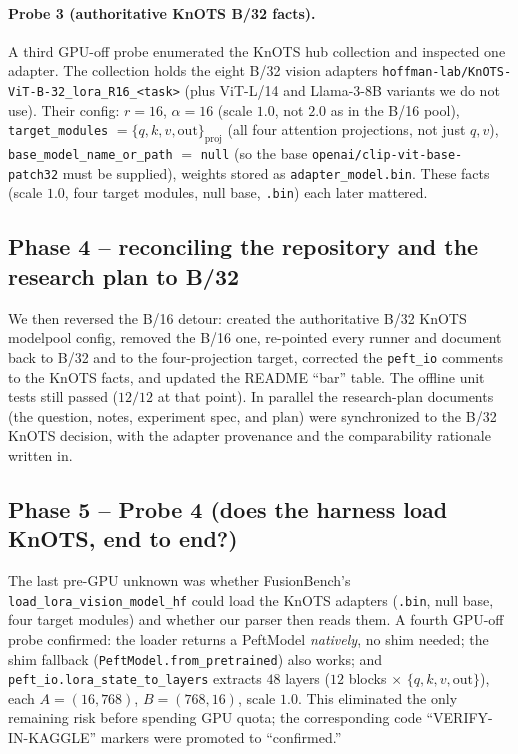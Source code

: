\paragraph{Probe 3 (authoritative KnOTS B/32 facts).}
A third GPU-off probe enumerated the KnOTS hub collection and inspected one adapter. The collection holds
the eight B/32 vision adapters \texttt{hoffman-lab/KnOTS-ViT-B-32\_lora\_R16\_<task>} (plus ViT-L/14 and
Llama-3-8B variants we do not use). Their config: $r=16$, $\alpha=16$ (scale $\mathbf{1.0}$, not $2.0$ as
in the B/16 pool), \texttt{target\_modules} $=\{q,k,v,\text{out}\}_{\text{proj}}$ (all four attention
projections, not just $q,v$), \texttt{base\_model\_name\_or\_path} $=$ \texttt{null} (so the base
\texttt{openai/clip-vit-base-patch32} must be supplied), weights stored as \texttt{adapter\_model.bin}.
These facts (scale $1.0$, four target modules, null base, \texttt{.bin}) each later mattered.

\subsection{Phase 4 -- reconciling the repository and the research plan to B/32}
\label{app:phase-reconcile}
We then reversed the B/16 detour: created the authoritative B/32 KnOTS modelpool config, removed the
B/16 one, re-pointed every runner and document back to B/32 and to the four-projection target, corrected
the \texttt{peft\_io} comments to the KnOTS facts, and updated the README ``bar'' table. The offline unit
tests still passed ($12/12$ at that point). In parallel the research-plan documents (the question,
notes, experiment spec, and plan) were synchronized to the B/32 KnOTS decision, with the adapter
provenance and the comparability rationale written in.

\subsection{Phase 5 -- Probe 4 (does the harness load KnOTS, end to end?)}
The last pre-GPU unknown was whether FusionBench's \texttt{load\_lora\_vision\_model\_hf} could load the
KnOTS adapters (\texttt{.bin}, null base, four target modules) and whether our parser then reads them. A
fourth GPU-off probe confirmed: the loader returns a PeftModel \emph{natively}, no shim needed; the shim
fallback (\texttt{PeftModel.from\_pretrained}) also works; and \texttt{peft\_io.lora\_state\_to\_layers}
extracts $48$ layers ($12$ blocks $\times$ $\{q,k,v,\text{out}\}$), each $A=(16,768)$, $B=(768,16)$, scale
$1.0$. This eliminated the only remaining risk before spending GPU quota; the corresponding code
``VERIFY-IN-KAGGLE'' markers were promoted to ``confirmed.''


